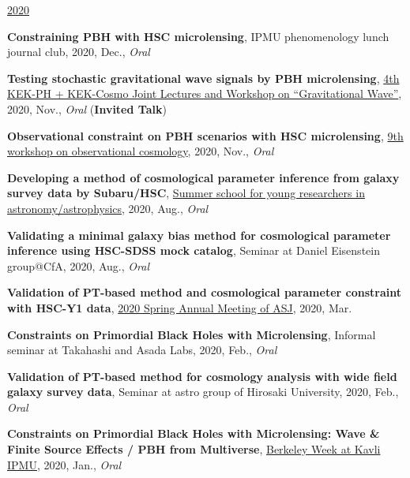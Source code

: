 \underline{2020}
\begin{etaremune}
\setcounter{enumi}{16}
\item \textbf{Constraining PBH with HSC microlensing}, IPMU phenomenology lunch journal club, 2020, Dec., \textit{Oral}
\item \textbf{Testing stochastic gravitational wave signals by PBH microlensing}, \href{http://conference-indico.kek.jp/event/117/timetable/#day-2020-11-04}{4th KEK-PH + KEK-Cosmo Joint Lectures and Workshop on ``Gravitational Wave''}, 2020, Nov., \textit{Oral} (\textbf{Invited Talk})
\item \textbf{Observational constraint on PBH scenarios with HSC microlensing}, \href{https://indico.ipmu.jp/event/382/timetable/#all}{9th workshop on observational cosmology}, 2020, Nov., \textit{Oral}
\item \textbf{Developing a method of cosmological parameter inference from galaxy survey data by Subaru/HSC}, \href{http://www.astro-wakate.org/ss2019/web/}{Summer school for young researchers in astronomy/astrophysics}, 2020, Aug., \textit{Oral}
\item \textbf{Validating a minimal galaxy bias method for cosmological parameter inference using HSC-SDSS mock catalog}, Seminar at Daniel Eisenstein group@CfA, 2020, Aug., \textit{Oral}
\item \textbf{Validation of PT-based method and cosmological parameter constraint with HSC-Y1 data}, \href{http://www.asj.or.jp/nenkai/archive/2020a/pdf/U03a.pdf}{2020 Spring Annual Meeting of ASJ}, 2020, Mar.
\item \textbf{Constraints on Primordial Black Holes with Microlensing}, Informal seminar at Takahashi and Asada Labs, 2020, Feb., \textit{Oral}
\item \textbf{Validation of PT-based method for cosmology analysis with wide field galaxy survey data}, Seminar at astro group of Hirosaki University, 2020, Feb., \textit{Oral}
\item \textbf{Constraints on Primordial Black Holes with Microlensing: Wave \& Finite Source Effects / PBH from Multiverse}, \href{http://indico.ipmu.jp/event/313/overview}{Berkeley Week at Kavli IPMU}, 2020, Jan., \textit{Oral}
\end{etaremune}

